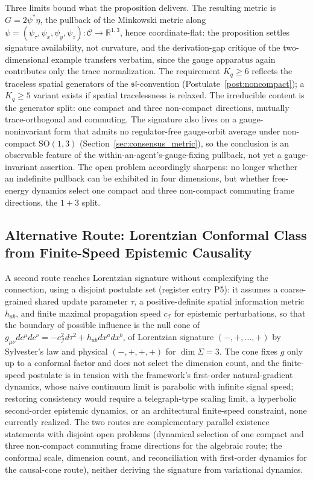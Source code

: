 \documentclass[11pt]{article}
\begin{document}
Three limits bound what the proposition delivers. The resulting metric is $G = 2\psi^*\eta$, the pullback of the Minkowski metric along $\psi = (\psi_\tau, \psi_x, \psi_y, \psi_z): \mathcal{C} \to \mathbb{R}^{1,3}$, hence coordinate-flat: the proposition settles signature availability, not curvature, and the derivation-gap critique of the two-dimensional example transfers verbatim, since the gauge apparatus again contributes only the trace normalization. The requirement $K_q \geq 6$ reflects the traceless spatial generators of the $\mathfrak{sl}$-convention (Postulate~\ref{post:noncompact}); a $K_q \geq 5$ variant exists if spatial tracelessness is relaxed. The irreducible content is the generator split: one compact and three non-compact directions, mutually trace-orthogonal and commuting. The signature also lives on a gauge-noninvariant form that admits no regulator-free gauge-orbit average under non-compact $\mathrm{SO}(1,3)$ (Section~\ref{sec:consensus_metric}), so the conclusion is an observable feature of the within-an-agent's-gauge-fixing pullback, not yet a gauge-invariant assertion. The open problem accordingly sharpens: no longer whether an indefinite pullback can be exhibited in four dimensions, but whether free-energy dynamics select one compact and three non-compact commuting frame directions, the $1{+}3$ split.

\subsection{Alternative Route: Lorentzian Conformal Class from Finite-Speed Epistemic Causality}
\label{sec:causal_cone_route}

A second route reaches Lorentzian signature without complexifying the connection, using a disjoint postulate set (register entry P5): it assumes a coarse-grained shared update parameter $\tau$, a positive-definite spatial information metric $h_{ab}$, and finite maximal propagation speed $c_\mathcal{I}$ for epistemic perturbations, so that the boundary of possible influence is the null cone of $g_{\mu\nu} dc^\mu dc^\nu = -c_\mathcal{I}^2 d\tau^2 + h_{ab} dx^a dx^b$, of Lorentzian signature $(-,+,\ldots,+)$ by Sylvester's law and physical $(-,+,+,+)$ for $\dim\Sigma = 3$. The cone fixes $g$ only up to a conformal factor and does not select the dimension count, and the finite-speed postulate is in tension with the framework's first-order natural-gradient dynamics, whose naive continuum limit is parabolic with infinite signal speed; restoring consistency would require a telegraph-type scaling limit, a hyperbolic second-order epistemic dynamics, or an architectural finite-speed constraint, none currently realized. The two routes are complementary parallel existence statements with disjoint open problems (dynamical selection of one compact and three non-compact commuting frame directions for the algebraic route; the conformal scale, dimension count, and reconciliation with first-order dynamics for the causal-cone route), neither deriving the signature from variational dynamics.
\end{document}
